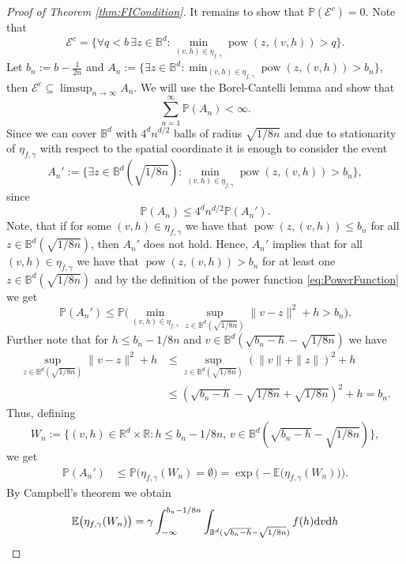 \documentclass[11pt,a4paper]{article}
\theoremstyle{plain}
\theoremstyle{definition}
\theoremstyle{remark}
\def\BB{\mathbb{B}}
\def\EE{\mathbb{E}}
\def\PP{\mathbb{P}}
\def\RR{\mathbb{R}}
\newcommand{\dd}{{\rm d}}
\newcommand{\pow}{\mathop{\mathrm{pow}}\nolimits}
\begin{document}
\begin{proof}[Proof of Theorem \ref{thm:FICondition}]
    It remains to show that $\PP(\mathcal{E}^c)=0$. Note that
    \[
        \mathcal{E}^c=\{\forall q < b \,\exists z\in \BB^d: \min_{(v,h)\in \eta_{f,\gamma}} \pow(z,(v,h))>q\}.
    \]
    Let $b_n:=b-\frac{1}{2n}$ and $A_n:=\{\exists z\in \BB^d: \min_{(v,h)\in \eta_{f,\gamma}}\pow(z,(v,h))>b_n \}$, then $\mathcal{E}^c\subseteq \limsup_{n\to \infty} A_n$. We will use the Borel-Cantelli lemma and show that
    \[
    \sum_{n=1}^{\infty}\PP(A_n)<\infty.
    \]
    Since we can cover $\BB^d$ with $4^dn^{d/2}$ balls of radius $\sqrt{1/8n}$ and due to stationarity of $\eta_{f,\gamma}$ with respect to the spatial coordinate it is enough to consider the event
    \[
        A_n':= \big\{\exists z\in \BB^d(\sqrt{1/8n}): \min_{(v,h)\in \eta_{f,\gamma}}\pow(z,(v,h))>b_n \big\},
    \]
    since 
    \begin{equation}\label{eq:28.05.24_7}
        \PP(A_n)\leq 4^dn^{d/2}\PP(A_n').
    \end{equation}
    Note, that if for some $(v,h)\in\eta_{f,\gamma}$ we have that $\pow(z,(v,h))\leq b_n$ for all $z\in \BB^d(\sqrt{1/8n})$, then $A_n'$ does not hold. Hence, $A_n'$ implies that for all $(v,h)\in\eta_{f,\gamma}$ we have that $\pow(z,(v,h))>b_n$ for at least one $z\in \BB^d(\sqrt{1/8n})$ and by the definition of the power function \eqref{eq:PowerFunction} we get
    \[
        \PP(A_n')\le \PP\big(\min_{(v,h)\in \eta_{f,\gamma}} \sup_{z\in \BB^d(\sqrt{1/8n})} \|v-z\|^2+h > b_n\big).
    \]
   Further note that for $h\leq b_n-1/8n$ and $v\in \BB^d(\sqrt{b_n-h}-\sqrt{1/8n})$ we have
    \begin{align*}   
        \sup_{z\in \BB^d(\sqrt{1/8n})} \|v-z\|^2+h &\le \sup_{z\in \BB^d(\sqrt{1/8n})}(\|v\|+ \|z\|)^2 + h \\
        &\le (\sqrt{b_n-h}-\sqrt{1/8n} + \sqrt{1/8n})^2 + h = b_n.
    \end{align*}
    Thus, defining 
    \[
        W_{n}:=\{(v,h)\in \RR^d \times \RR:  h\le b_n-1/8n,\, v\in \BB^d(\sqrt{b_n-h}-\sqrt{1/8n})\},
    \]
    we get
    \begin{align}    
        \PP(A_n')&\le \PP\big(\eta_{f,\gamma}(W_n) = \emptyset\big)=\exp\big(-\EE\big(\eta_{f,\gamma}(W_{n})\big)\big).\label{eq:28.05.24_8}
    \end{align}
    By Campbell's theorem \cite[Theorem 3.1.2]{SW} we obtain
    \begin{align*}
        \EE\big(\eta_{f,\gamma}(W_{n})\big) &= \gamma \int_{-\infty}^{b_n-1/8n} \int_{\BB^d(\sqrt{b_n-h}-\sqrt{1/8n})} f(h) \dd v \dd h\\

\end{align*}
\end{proof}
\end{document}
